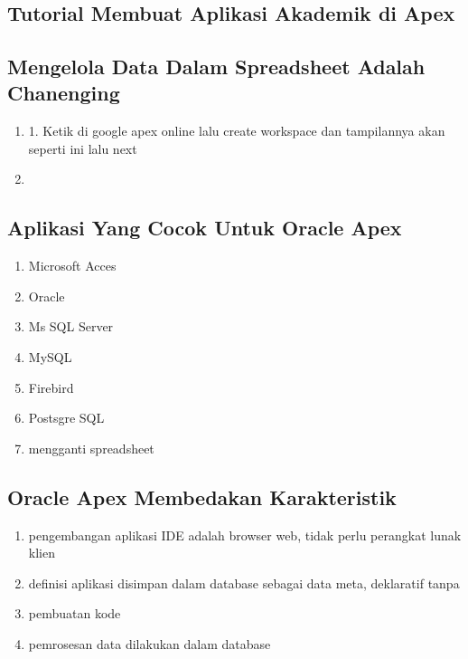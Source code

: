 \chapter{}

\section{Tutorial Membuat Aplikasi Akademik di Apex}

\section{Mengelola Data Dalam Spreadsheet Adalah Chanenging}
\begin{enumerate}
    \item 1.	Ketik di google apex online lalu create workspace dan tampilannya akan seperti ini lalu next
    
    \item 

\end{enumerate}


\section{Aplikasi Yang Cocok Untuk Oracle Apex}
\begin{enumerate}
\item Microsoft Acces
\item Oracle
\item Ms SQL Server
\item MySQL
\item Firebird
\item Postsgre SQL
\item mengganti spreadsheet
\end{enumerate}

\section{Oracle Apex Membedakan Karakteristik}
\begin{enumerate}
\item pengembangan aplikasi IDE adalah browser web, tidak perlu perangkat lunak klien
\item definisi aplikasi disimpan dalam database sebagai data meta, deklaratif tanpa \item pembuatan kode
\item pemrosesan data dilakukan dalam database

\end{enumerate}

